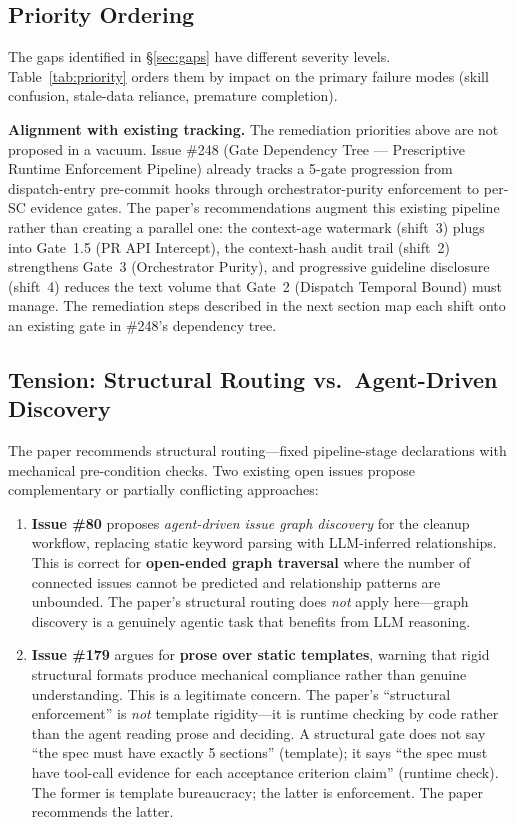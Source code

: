 \documentclass[11pt,a4paper]{article}
\begin{document}
\subsection{Priority Ordering}
\label{sec:priority}

The gaps identified in \S\ref{sec:gaps} have different severity levels.  Table~\ref{tab:priority} orders them by impact on the primary failure modes (skill confusion, stale-data reliance, premature completion).

\begin{insightbox}
\textbf{Alignment with existing tracking.}  The remediation priorities above are not proposed in a vacuum.  Issue \#248 (Gate Dependency Tree --- Prescriptive Runtime Enforcement Pipeline) already tracks a 5-gate progression from dispatch-entry pre-commit hooks through orchestrator-purity enforcement to per-SC evidence gates.  The paper's recommendations augment this existing pipeline rather than creating a parallel one: the context-age watermark (shift~3) plugs into Gate~1.5 (PR API Intercept), the context-hash audit trail (shift~2) strengthens Gate~3 (Orchestrator Purity), and progressive guideline disclosure (shift~4) reduces the text volume that Gate~2 (Dispatch Temporal Bound) must manage.  The remediation steps described in the next section map each shift onto an existing gate in \#248's dependency tree.
\end{insightbox}

\subsection{Tension: Structural Routing vs.\ Agent-Driven Discovery}

The paper recommends structural routing---fixed pipeline-stage declarations with mechanical pre-condition checks.  Two existing open issues propose complementary or partially conflicting approaches:

\begin{enumerate}[leftmargin=*]
  \item \textbf{Issue \#80} proposes \emph{agent-driven issue graph discovery} for the cleanup workflow, replacing static keyword parsing with LLM-inferred relationships.  This is correct for \textbf{open-ended graph traversal} where the number of connected issues cannot be predicted and relationship patterns are unbounded.  The paper's structural routing does \emph{not} apply here---graph discovery is a genuinely agentic task that benefits from LLM reasoning.
  \item \textbf{Issue \#179} argues for \textbf{prose over static templates}, warning that rigid structural formats produce mechanical compliance rather than genuine understanding.  This is a legitimate concern.  The paper's ``structural enforcement'' is \emph{not} template rigidity---it is runtime checking by code rather than the agent reading prose and deciding.  A structural gate does not say ``the spec must have exactly 5 sections'' (template); it says ``the spec must have tool-call evidence for each acceptance criterion claim'' (runtime check).  The former is template bureaucracy; the latter is enforcement.  The paper recommends the latter.
\end{enumerate}
\end{document}
